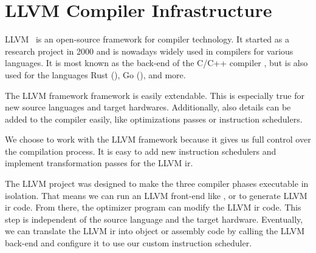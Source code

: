 \section{LLVM Compiler Infrastructure}
\label{sec:bg:llvm}
LLVM~\cite{LLVM:CGO04} is an open-source framework for compiler technology.
It started as a research project in 2000 and is nowadays widely used in compilers for various languages.
It is most known as the back-end of the C/C++ compiler , but is also used for the languages Rust (), Go (), and more.

The LLVM framework framework is easily extendable.
This is especially true for new source languages and target hardwares.
Additionally, also details can be added to the compiler easily, like optimizations passes or instruction schedulers.

We choose to work with the LLVM framework because it gives us full control over the compilation process.
It is easy to add new instruction schedulers and implement transformation passes for the LLVM \ac{ir}.

The LLVM project was designed to make the three compiler phases executable in isolation.
That means we can run an LLVM front-end like , or  to generate LLVM \ac{ir} code.
From there, the optimizer program  can modify the LLVM \ac{ir} code.
This step is independent of the source language and the target hardware.
Eventually, we can translate the LLVM \ac{ir} into object or assembly code by calling the LLVM back-end  and configure it to use our custom instruction scheduler.

